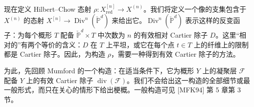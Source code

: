 现在定义 Hilbert--Chow 态射 $\rho:X^{[n]}_{\mathrm{red}}\to X^{(n)}$。我们将定义一个像的支集包含于 $X^{(n)}$ 的态射 $X^{[n]}\to\operatorname{Div}^n(\check{\mathbb P}^d)$ 来给出它。$\operatorname{Div}^n(\check{\mathbb P}^d)$ 表示这样的反变函子：为每个概形 $T$ 配备 $\check{\mathbb P}^d\times T$ 中次数为 $n$ 的有效相对 Cartier 除子 $D$。这里“相对的”有两个等价的含义：$D$ 在 $T$ 上平坦，或它在每个点 $t\in T$ 上的纤维上的限制都是 Cartier 除子。因此，为构造 $\rho$，需要一种得到有效 Cartier 除子的方法。

为此，先回顾 Mumford 的一个构造：在适当条件下，它为概形 $Y$ 上的凝聚层 $\mathcal F$ 配备 $Y$ 上的有效 Cartier 除子 $\operatorname{div}(\mathcal F)$。我们不会给出这一构造的全部细节或最一般形式，而只在关心的情形下给出梗概。一般构造可见 [MFK94] 第 5 章第 3 节。

